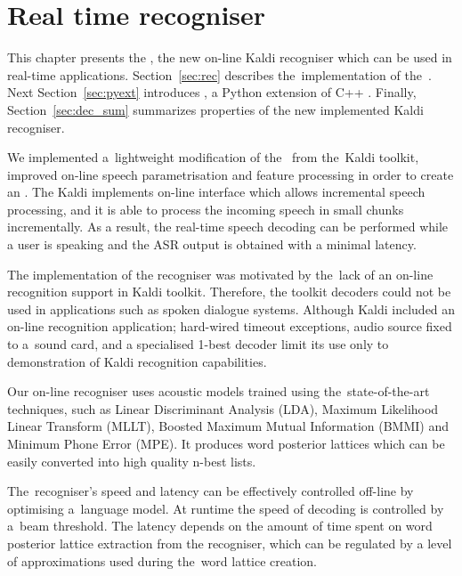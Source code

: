 \chapter{Real time recogniser}
\label{cha:decoder}
This chapter presents the , the new on-line Kaldi recogniser which can be used in real-time applications.
Section~\ref{sec:rec} describes the~implementation of the~.
Next Section~\ref{sec:pyext} introduces , a Python extension of C++ .
Finally, Section~\ref{sec:dec_sum} summarizes properties of the new implemented Kaldi recogniser.

We implemented a~lightweight modification of the~ from the~Kaldi toolkit, improved on-line speech parametrisation and feature processing in order to create an .
The Kaldi  implements on-line interface which allows incremental speech processing, and it is able to process the incoming speech in small chunks incrementally.
As a result, the real-time speech decoding can be performed while a user is speaking and the ASR output is obtained with a minimal latency.

The implementation of the recogniser was motivated by the~lack of an on-line recognition support in Kaldi toolkit.
Therefore, the toolkit decoders could not be used in applications such as spoken dialogue systems.
Although Kaldi included an on-line recognition application; hard-wired timeout exceptions, audio source fixed to a~sound card, and a specialised 1-best decoder limit its use only to demonstration of Kaldi recognition capabilities.

Our on-line recogniser uses acoustic models trained using the~state-of-the-art techniques, 
such as Linear Discriminant Analysis (LDA), Maximum Likelihood Linear Transform (MLLT), Boosted Maximum Mutual Information (BMMI) and Minimum Phone Error (MPE).
It produces word posterior lattices which can be easily converted into high quality n-best lists.

The~recogniser's speed and latency can be effectively controlled off-line by optimising a~language model. 
At runtime the speed of decoding is controlled by a~beam threshold.
The latency depends on the amount of time spent on word posterior lattice extraction from the recogniser, which can be regulated by a level of approximations used during the~word lattice creation.

